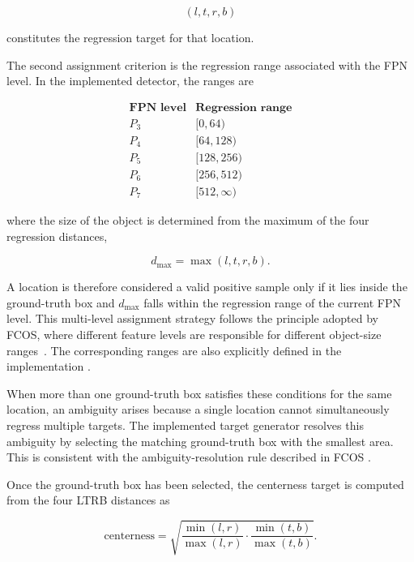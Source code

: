 \documentclass[11pt,a4paper]{article}
\begin{document}
\begin{equation}
(l,t,r,b)
\end{equation}

constitutes the regression target for that location.

The second assignment criterion is the regression range associated with the
FPN level. In the implemented detector, the ranges are

\begin{equation}
\begin{array}{c|c}
\textbf{FPN level} & \textbf{Regression range} \\
\hline
P_3 & [0,64) \\
P_4 & [64,128) \\
P_5 & [128,256) \\
P_6 & [256,512) \\
P_7 & [512,\infty)
\end{array}
\end{equation}

where the size of the object is determined from the maximum of the four
regression distances,

\begin{equation}
d_{\max} = \max(l,t,r,b).
\end{equation}

A location is therefore considered a valid positive sample only if it lies
inside the ground-truth box and $d_{\max}$ falls within the regression range
of the current FPN level. This multi-level assignment strategy follows the
principle adopted by FCOS, where different feature levels are responsible
for different object-size ranges~\cite{tian2019fcos}. The corresponding
ranges are also explicitly defined in the implementation
\cite{tian2019fcos}.

When more than one ground-truth box satisfies these conditions for the same
location, an ambiguity arises because a single location cannot simultaneously
regress multiple targets. The implemented target generator resolves this
ambiguity by selecting the matching ground-truth box with the smallest area.
This is consistent with the ambiguity-resolution rule described in FCOS
\cite{tian2019fcos}.

Once the ground-truth box has been selected, the centerness target is computed
from the four LTRB distances as

\begin{equation}
\mathrm{centerness}
=
\sqrt{
\frac{\min(l,r)}{\max(l,r)}
\cdot
\frac{\min(t,b)}{\max(t,b)}
}.
\end{equation}
\end{document}

